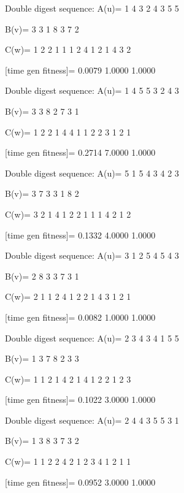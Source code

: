 Double digest sequence:
A(u)=
     1     4     3     2     4     3     5     5

B(v)=
     3     3     1     8     3     7     2

C(w)=
     1     2     2     1     1     1     2     4     1     2     1     4     3     2

[time gen fitness]=
    0.0079    1.0000    1.0000

Double digest sequence:
A(u)=
     1     4     5     5     3     2     4     3

B(v)=
     3     3     8     2     7     3     1

C(w)=
     1     2     2     1     4     4     1     1     2     2     3     1     2     1

[time gen fitness]=
    0.2714    7.0000    1.0000

Double digest sequence:
A(u)=
     5     1     5     4     3     4     2     3

B(v)=
     3     7     3     3     1     8     2

C(w)=
     3     2     1     4     1     2     2     1     1     1     4     2     1     2

[time gen fitness]=
    0.1332    4.0000    1.0000

Double digest sequence:
A(u)=
     3     1     2     5     4     5     4     3

B(v)=
     2     8     3     3     7     3     1

C(w)=
     2     1     1     2     4     1     2     2     1     4     3     1     2     1

[time gen fitness]=
    0.0082    1.0000    1.0000

Double digest sequence:
A(u)=
     2     3     4     3     4     1     5     5

B(v)=
     1     3     7     8     2     3     3

C(w)=
     1     1     2     1     4     2     1     4     1     2     2     1     2     3

[time gen fitness]=
    0.1022    3.0000    1.0000

Double digest sequence:
A(u)=
     2     4     4     3     5     5     3     1

B(v)=
     1     3     8     3     7     3     2

C(w)=
     1     1     2     2     4     2     1     2     3     4     1     2     1     1

[time gen fitness]=
    0.0952    3.0000    1.0000

